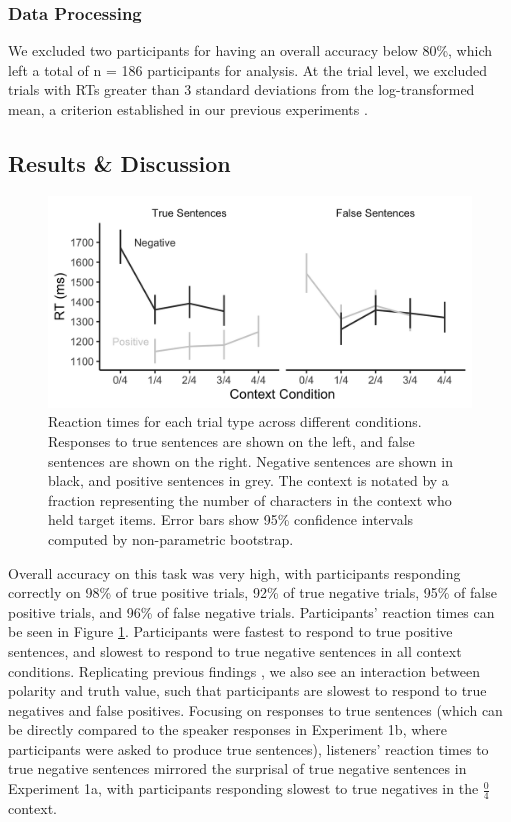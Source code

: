 \documentclass[man, floatsintext, noapacite]{apa6}
\begin{document}
\subsubsection{Data Processing} 

We excluded two participants for having an overall accuracy below 80\%, which left a total of n = 186 participants for analysis. At the trial level, we excluded trials with RTs greater than 3 standard deviations from the log-transformed mean, a criterion established in our previous experiments \cite{nordmeyer2014}. 

\subsection{Results \& Discussion}

\begin{figure}[t]
\begin{center} 
\includegraphics[width=6in]{figures/experiment1/listener_rts.png}
\caption{\label{fig:exp1_listenerrt} Reaction times for each trial type across different conditions. Responses to true sentences are shown on the left, and false sentences are shown on the right.  Negative sentences are shown in black, and positive sentences in grey.  The context is notated by a fraction representing the number of characters in the context who held target items. Error bars show 95\% confidence intervals computed by non-parametric bootstrap.}
\end{center} 
\end{figure}

Overall accuracy on this task was very high, with participants responding correctly on 98\% of true positive trials, 92\% of true negative trials, 95\% of false positive trials, and 96\% of false negative trials.  Participants' reaction times can be seen in Figure \ref{fig:exp1_listenerrt}. Participants were fastest to respond to true positive sentences, and slowest to respond to true negative sentences in all context conditions. Replicating previous findings \cite{hclark1972}, we also see an interaction between polarity and truth value, such that participants are slowest to respond to true negatives and false positives. Focusing on responses to true sentences (which can be directly compared to the speaker responses in Experiment 1b, where participants were asked to produce true sentences), listeners' reaction times to true negative sentences mirrored the surprisal of true negative sentences in Experiment 1a, with participants responding slowest to true negatives in the $\frac{0}{4}$ context.
\end{document}
